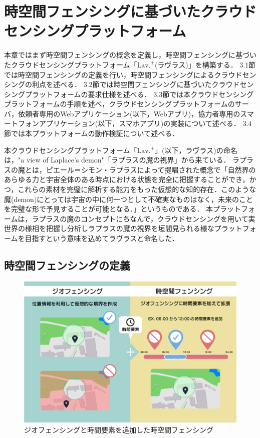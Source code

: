 \chapter{時空間フェンシングに基づいたクラウドセンシングプラットフォーム}
\thispagestyle{myheadings}
本章ではまず時空間フェンシングの概念を定義し，時空間フェンシングに基づいたクラウドセンシングプラットフォーム「$\text{Lav.}^{+}$(ラヴラス)」を構築する．
3.1節では時空間フェンシングの定義を行い，時空間フェンシングによるクラウドセンシングの利点を述べる．
3.2節では時空間フェンシングに基づいたクラウドセンシングプラットフォームの要求仕様を述べる．
3.3節では本クラウドセンシングプラットフォームの手順を述べ，クラウドセンシングプラットフォームのサーバ，依頼者専用のWebアプリケーション(以下，Webアプリ)，協力者専用のスマートフォンアプリケーション(以下，スマホアプリ)の実装について述べる．
3.4節では本プラットフォームの動作検証について述べる．


本クラウドセンシングプラットフォーム「$\text{Lav.}^{+}$」(以下，ラヴラス)の命名は，"a view of Laplace's demon"「ラプラスの魔の視界」から来ている．
ラプラスの魔とは，ピエール＝シモン・ラプラスによって提唱された概念で「自然界のあらゆる力と宇宙全体のある時点における状態を完全に把握することができ，かつ，これらの素材を完璧に解析する能力をもった仮想的な知的存在．このような魔(demon)にとっては宇宙の中に何一つとして不確実なものはなく，未来のことを完璧な形で予見することが可能となる．」\cite{ziten}というものである．
本プラットフォームは，ラプラスの魔のコンセプトにちなんで，クラウドセンシングを用いて実世界の様相を把握し分析しラプラスの魔の視界を垣間見られる様なプラットフォームを目指すという意味を込めてラヴラスと命名した．
%

\section{時空間フェンシングの定義}

\begin{figure}[H]
    \centering
    \includegraphics[width=150mm]{spatiotemporal.png}
    \caption{ジオフェンシングと時間要素を追加した時空間フェンシング}
    \label{fensing}
\end{figure}

